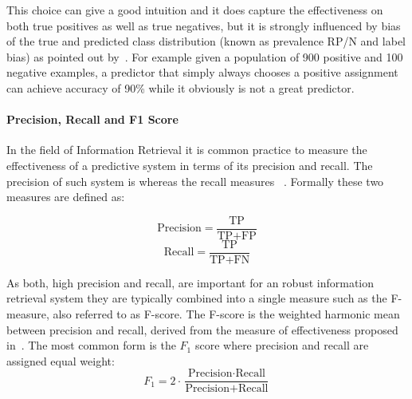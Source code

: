 This choice can give a good intuition and it does capture the effectiveness on both true positives as well as true negatives, but it is strongly influenced by bias of the true and predicted class distribution (known as prevalence RP/N and label bias) as pointed out by~\cite{Powers:2011aa}. For example given a population of 900 positive and 100 negative examples, a predictor that simply always chooses a positive assignment can achieve accuracy of 90\% while it obviously is not a great predictor.

\cite[Chapter 8.3, p.~155]{Manning:2008aa}

\paragraph{Precision, Recall and F1 Score}
\label{par:Precision, Recall and F1 Score}

In the field of Information Retrieval it is common practice to measure the effectiveness of a predictive system in terms of its precision and recall.
The precision of such system is  whereas the recall measures ~\cite{Rijsbergen:1979aa}. Formally these two measures are defined as:

\begin{equation}
    \text{Precision} = \frac{\text{TP}}{\text{TP} + \text{FP}}
\end{equation}
\begin{equation}
    \text{Recall} = \frac{\text{TP}}{\text{TP} + \text{FN}}
\end{equation}


As both, high precision and recall, are important for an robust information retrieval system they are typically combined into a single measure such as the F-measure, also referred to as F-score. The F-score is the weighted harmonic mean between precision and recall, derived from the measure of effectiveness proposed in~\cite{Rijsbergen:1979aa}. The most common form is the $F_1$ score  where precision and recall are assigned equal weight:
\begin{equation}
  \label{f1measure}
  F_1 = 2 \cdot \frac{\text{Precision} \cdot \text{Recall}}{\text{Precision} + \text{Recall}}
\end{equation}

